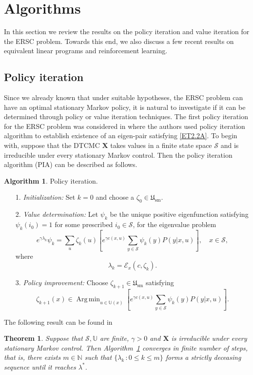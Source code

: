 \documentclass[notitlepage,11pt,reqno]{amsart}
\numberwithin{equation}{section}
\theoremstyle{plain}
\newtheorem{theorem}{Theorem}[section]
\theoremstyle{definition}
\newtheorem{algorithm}{Algorithm}[section]
\theoremstyle{remark}
\newcommand{\Act}{{\mathds{U}}}
\newcommand{\sE}{{\mathscr{E}}}     %
\newcommand{\cS}{{\mathcal{S}}}     %
\newcommand{\Usm}{\mathfrak{U}_{\mathrm{sm}}}
\newcommand{\NN}{\mathds{N}} %
\DeclareMathOperator*{\Argmin}{Arg\,min}
\begin{document}
\section{Algorithms}
In this section we review the results on the policy iteration and value iteration for the ERSC problem. Towards this end, we also discuss a few 
recent results on equivalent linear programs and reinforcement learning.

\subsection{Policy iteration}
 Since we already known that under suitable hypotheses, the ERSC problem can have an optimal stationary Markov policy, it is natural to investigate if it can be determined through policy or value iteration techniques.
 The first policy iteration for the ERSC problem was considered in \cite{Howard-71} where the authors used policy iteration algorithm to establish existence of an eigen-pair satisfying \eqref{ET2.2A}.
  To begin with, suppose that the DTCMC $\textbf{X}$ takes values in a finite state space
 $\cS$ and is irreducible under every stationary Markov control. Then the policy iteration algorithm (PIA) can be described as follows.

\begin{algorithm}\label{Alg-6.1}
Policy iteration.
\begin{itemize}
\item[1.] \textit{Initialization:} Set $k=0$ and choose a $\zeta_0\in\Usm$.
\item[2.] \textit{Value determination:} Let $\psi_k$ be the unique positive eigenfunction  satisfying $\psi_k(i_0)=1$ for some prescribed $i_0\in\cS$, for the eigenvalue problem  
$$e^{\gamma \lambda_k}\psi_k= \sum_u\zeta_k(u)\left[e^{\gamma c(x, u)}\sum_{y\in\cS} \psi_k(y) P(y|x, u)\right],\quad x\in\cS,$$
where 
$$\lambda_k=\sE_x(c, \zeta_k).$$
\item[3.] \textit{Policy improvement:} Choose $\zeta_{k+1}\in\Usm$ satisfying
$$\zeta_{k+1}(x)\in \Argmin_{u\in\Act(x)} \left[e^{\gamma c(x, u)}\sum_{y\in\cS} \psi_k(y) P(y|x, u)\right].$$
\end{itemize}
\end{algorithm}

The following result can be found in \cite[Theorem~4.7]{Fleming-97a}
\begin{theorem}
Suppose that $\cS, \Act$ are finite, $\gamma>0$ and $\textbf{X}$ is irreducible under every stationary Markov control. Then Algorithm~\ref{Alg-6.1} converges in finite number of steps, that is,
there exists $m\in\NN$ such that $\{\lambda_k\,: 0\leq k\leq m\}$ forms a strictly deceasing sequence until it reaches $\lambda^*$.
\end{theorem}
\end{document}
